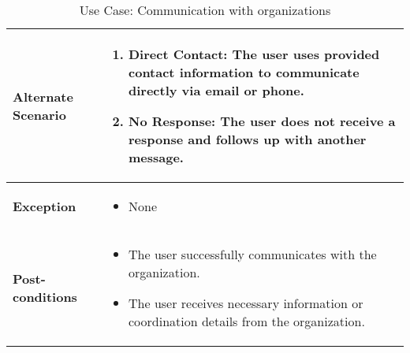 \begin{table}[!ht]
\begin{tabularx}{\textwidth}{|l|X|}
        \hline
        \textbf{Alternate Scenario} & 
        \begin{enumerate}[label=\arabic*.,itemsep=0pt]
            \item Direct Contact: The user uses provided contact information to communicate directly via email or phone.
            \item No Response: The user does not receive a response and follows up with another message.
        \end{enumerate} \\
        \hline
        \textbf{Exception} & 
        \begin{itemize}[label=--,itemsep=0pt]
            \item None
        \end{itemize} \\
        \hline
        \textbf{Post-conditions} & 
        \begin{itemize}[label=--,itemsep=0pt]
            \item The user successfully communicates with the organization.
            \item The user receives necessary information or coordination details from the organization.
        \end{itemize} \\
        \hline
    \end{tabularx}
    \caption{Use Case: Communication with organizations}
    \label{tab:use-case-register}
\end{table}


